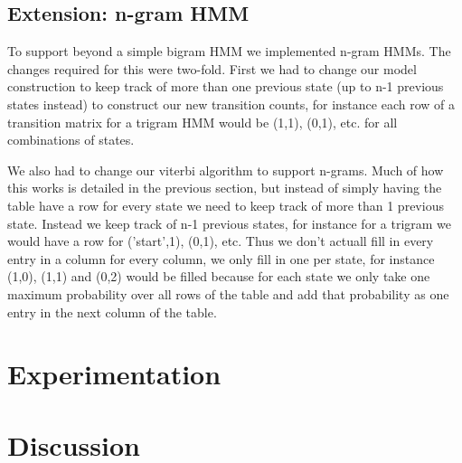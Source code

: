 \documentclass{article}
\begin{document}
\subsection*{Extension: n-gram HMM}

To support beyond a simple bigram HMM we implemented n-gram HMMs. The changes required for this were two-fold. First we had to change our model construction to keep track of more than one previous state (up to n-1 previous states instead) to construct our new transition counts, for instance each row of a transition matrix for a trigram HMM would be (1,1), (0,1), etc. for all combinations of states. 

We also had to change our viterbi algorithm to support n-grams. Much of how this works is detailed in the previous section, but instead of simply having the table have a row for every state we need to keep track of more than 1 previous state. Instead we keep track of n-1 previous states, for instance for a trigram we would have a row for ('start',1), (0,1), etc. Thus we don't actuall fill in every entry in a column for every column, we only fill in one per state, for instance (1,0), (1,1) and (0,2) would be filled because for each state we only take one maximum probability over all rows of the table and add that probability as one entry in the next column of the table. 


\section{Experimentation}
\section{Discussion}
\end{document}
